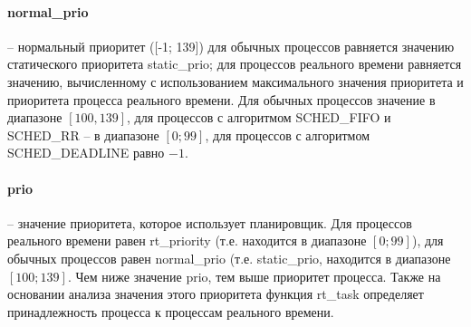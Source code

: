 \paragraph*{normal\_prio} -- нормальный приоритет ([-1; 139]) для обычных процессов равняется значению статического приоритета static\_prio; для процессов реального времени равняется значению, вычисленному с использованием максимального значения приоритета и приоритета процесса реального времени. Для обычных процессов значение в диапазоне $[100, 139]$, для процессов с алгоритмом SCHED\_FIFO и SCHED\_RR -- в диапазоне $[0; 99]$, для процессов с алгоритмом SCHED\_DEADLINE равно $-1$.


\paragraph*{prio} -- значение приоритета, которое использует планировщик. Для процессов реального времени равен rt\_priority (т.е. находится в диапазоне $[0;99]$), для обычных процессов равен normal\_prio (т.е. static\_prio, находится в диапазоне $[100;139]$. Чем ниже значение prio, тем выше приоритет процесса. Также на основании анализа значения этого приоритета функция rt\_task определяет принадлежность процесса к процессам реального времени. 


